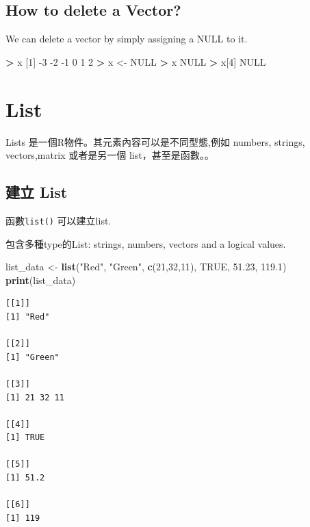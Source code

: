 \documentclass[]{book}
\newenvironment{Shaded}{\begin{snugshade}}{\end{snugshade}}
\newcommand{\DecValTok}[1]{\textcolor[rgb]{0.00,0.00,0.81}{#1}}
\newcommand{\FloatTok}[1]{\textcolor[rgb]{0.00,0.00,0.81}{#1}}
\newcommand{\KeywordTok}[1]{\textcolor[rgb]{0.13,0.29,0.53}{\textbf{#1}}}
\newcommand{\NormalTok}[1]{#1}
\newcommand{\OperatorTok}[1]{\textcolor[rgb]{0.81,0.36,0.00}{\textbf{#1}}}
\newcommand{\OtherTok}[1]{\textcolor[rgb]{0.56,0.35,0.01}{#1}}
\newcommand{\StringTok}[1]{\textcolor[rgb]{0.31,0.60,0.02}{#1}}
\theoremstyle{definition}
\theoremstyle{definition}
\theoremstyle{definition}
\theoremstyle{remark}
\begin{document}
\hypertarget{how-to-delete-a-vector}{%
\subsection{How to delete a Vector?}\label{how-to-delete-a-vector}}

We can delete a vector by simply assigning a NULL to it.

\begin{Shaded}
\begin{Highlighting}[]
\OperatorTok{>}\StringTok{ }\NormalTok{x}
\NormalTok{[}\DecValTok{1}\NormalTok{] }\DecValTok{-3} \DecValTok{-2} \DecValTok{-1}  \DecValTok{0}  \DecValTok{1}  \DecValTok{2}
\OperatorTok{>}\StringTok{ }\NormalTok{x <-}\StringTok{ }\OtherTok{NULL}
\OperatorTok{>}\StringTok{ }\NormalTok{x}
\OtherTok{NULL}
\OperatorTok{>}\StringTok{ }\NormalTok{x[}\DecValTok{4}\NormalTok{]}
\OtherTok{NULL}
\end{Highlighting}
\end{Shaded}

\hypertarget{list}{%
\section{List}\label{list}}

Lists 是一個R物件。其元素內容可以是不同型態,例如 numbers, strings,
vectors,matrix 或者是另一個 list，甚至是函數。。

\hypertarget{-list}{%
\subsection{建立 List}\label{-list}}

函數\texttt{list()} 可以建立list.

包含多種type的List: strings, numbers, vectors and a logical values.

\begin{Shaded}
\begin{Highlighting}[]
\NormalTok{list_data <-}\StringTok{ }\KeywordTok{list}\NormalTok{(}\StringTok{"Red"}\NormalTok{, }\StringTok{"Green"}\NormalTok{, }\KeywordTok{c}\NormalTok{(}\DecValTok{21}\NormalTok{,}\DecValTok{32}\NormalTok{,}\DecValTok{11}\NormalTok{), }\OtherTok{TRUE}\NormalTok{, }\FloatTok{51.23}\NormalTok{, }\FloatTok{119.1}\NormalTok{)}
\KeywordTok{print}\NormalTok{(list_data)}
\end{Highlighting}
\end{Shaded}

\begin{verbatim}
[[1]]
[1] "Red"

[[2]]
[1] "Green"

[[3]]
[1] 21 32 11

[[4]]
[1] TRUE

[[5]]
[1] 51.2

[[6]]
[1] 119
\end{verbatim}
\end{document}
